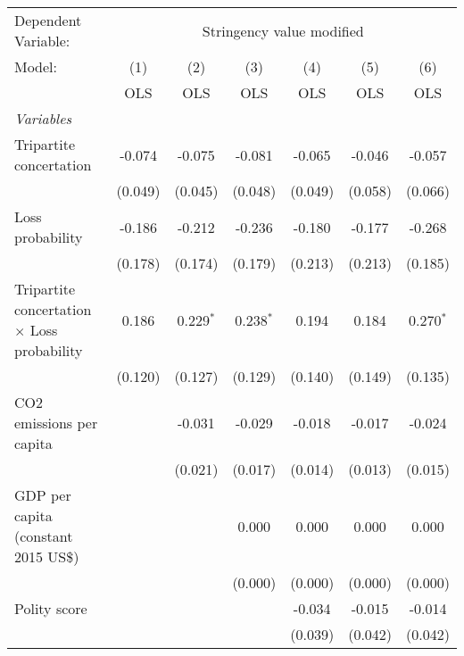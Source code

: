 
\begingroup
\centering
\begin{tabular}{lcccccc}
   \toprule
   Dependent Variable: & \multicolumn{6}{c}{Stringency value modified}\\
   Model:                                             & (1)     & (2)         & (3)         & (4)     & (5)     & (6)\\  
                                                      &  OLS    & OLS         & OLS         & OLS     & OLS     & OLS\\  
   \midrule
   \emph{Variables}\\
   Tripartite concertation                            & -0.074  & -0.075      & -0.081      & -0.065  & -0.046  & -0.057\\   
                                                      & (0.049) & (0.045)     & (0.048)     & (0.049) & (0.058) & (0.066)\\   
   Loss probability                                   & -0.186  & -0.212      & -0.236      & -0.180  & -0.177  & -0.268\\   
                                                      & (0.178) & (0.174)     & (0.179)     & (0.213) & (0.213) & (0.185)\\   
   Tripartite concertation $\times$ Loss probability  & 0.186   & 0.229$^{*}$ & 0.238$^{*}$ & 0.194   & 0.184   & 0.270$^{*}$\\   
                                                      & (0.120) & (0.127)     & (0.129)     & (0.140) & (0.149) & (0.135)\\   
   CO2 emissions per capita                           &         & -0.031      & -0.029      & -0.018  & -0.017  & -0.024\\   
                                                      &         & (0.021)     & (0.017)     & (0.014) & (0.013) & (0.015)\\   
   GDP per capita (constant 2015 US\$)                &         &             & 0.000       & 0.000   & 0.000   & 0.000\\   
                                                      &         &             & (0.000)     & (0.000) & (0.000) & (0.000)\\   
   Polity score                                       &         &             &             & -0.034  & -0.015  & -0.014\\   
                                                      &         &             &             & (0.039) & (0.042) & (0.042)\\   

\end{tabular}
